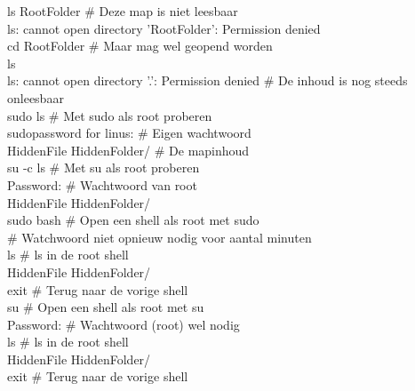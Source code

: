 \begin{bash}
\userprompt[~/Folder] ls RootFolder                         \# Deze map is niet leesbaar\\
ls: cannot open directory 'RootFolder': Permission denied\\

\userprompt[~/Folder] cd RootFolder                         \# Maar mag wel geopend worden\\

 ls\\
ls: cannot open directory '.': Permission denied           \# De inhoud is nog steeds onleesbaar\\

 sudo ls                    \# Met sudo als root proberen\\
\lbrack sudo\rbrack  password for linus:                                   \# Eigen wachtwoord\\
HiddenFile HiddenFolder/                                   \# De mapinhoud\\

 su -c ls                   \# Met su als root proberen\\
Password:                                                  \# Wachtwoord van root\\
HiddenFile HiddenFolder/\\

 sudo bash                  \# Open een shell als root met sudo\\
\# Watchwoord niet opnieuw nodig voor aantal minuten\\

 ls                \# ls in de root shell\\
HiddenFile HiddenFolder/\\

 exit              \# Terug naar de vorige shell\\

 su                         \# Open een shell als root met su\\
Password:                                                  \# Wachtwoord (root) wel nodig\\

 ls                \# ls in de root shell\\
HiddenFile HiddenFolder/\\

 exit              \# Terug naar de vorige shell\\
\end{bash}

